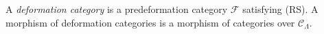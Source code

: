 \begin{definition}
\label{definition-deformation-category}
A {\it deformation category} is a predeformation category $\mathcal{F}$
satisfying (RS). A morphism of deformation categories is a morphism of
categories over $\mathcal{C}_\Lambda$.
\end{definition}
